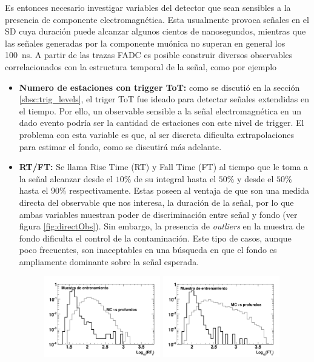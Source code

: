 	Es entonces necesario investigar variables del detector que sean sensibles a la presencia de componente electromagnética.
	Esta usualmente provoca señales en el SD cuya duración puede alcanzar algunos cientos de nanosegundos, mientras que las señales generadas por la componente muónica no superan en general los 100~ns.
	A partir de las trazas FADC es posible construir diversos observables correlacionados con la estructura temporal de la señal, como por ejemplo
	\begin{itemize}
	 \item \textbf{Numero de estaciones con trigger ToT:} como se discutió en la sección \ref{sbsc:trig_levels}, el triger ToT fue ideado para detectar señales extendidas en el tiempo.
	 Por ello, un observable sensible a la señal electromagnética en un dado evento podría ser la cantidad de estaciones con este nivel de trigger.
	 El problema con esta variable es que, al ser discreta dificulta extrapolaciones para estimar el fondo, como se discutirá más adelante.
	 \item \textbf{RT/FT:} Se llama Rise Time (RT) y Fall Time (FT) al tiempo que le toma a la señal alcanzar desde el $10\%$ de su integral hasta el $50\%$ y desde el $50\%$ hasta el $90\%$ respectivamente.
	 Estas poseen al ventaja de que son una medida directa del observable que nos interesa, la duración de la señal, por lo que ambas variables muestran poder de discriminación entre señal y fondo (ver figura \ref{fig:directObs}).
	 Sin embargo, la presencia de \emph{outliers} en la muestra de fondo dificulta el control de la contaminación.
	 Este tipo de casos, aunque poco frecuentes, son inaceptables en una búsqueda en que el fondo es ampliamente dominante sobre la señal esperada.
	 \begin{figure}[ht!]
		\begin{center}
		\includegraphics[width=0.48\textwidth]{fig/seleccionAuger/rt1}
		\hfill
		\includegraphics[width=0.48\textwidth]{fig/seleccionAuger/ft1}

\end{center}
\end{figure}
\end{itemize}
